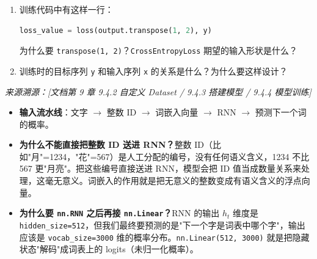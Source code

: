 \documentclass[a4paper,11pt]{ctexart}
\begin{document}
\begin{problembox}
\begin{enumerate}[(1)]
        \item 训练代码中有这样一行：
        \begin{lstlisting}[language=Python]
loss_value = loss(output.transpose(1, 2), y)
        \end{lstlisting}
        为什么要 \texttt{transpose(1, 2)}？\texttt{CrossEntropyLoss} 期望的输入形状是什么？

        \item 训练时的目标序列 \texttt{y} 和输入序列 \texttt{x} 的关系是什么？为什么要这样设计？
    \end{enumerate}

    \vspace{0.2cm}
    {\color{gray}\small\textit{来源溯源：[文档第 9 章 9.4.2 自定义 Dataset / 9.4.3 搭建模型 / 9.4.4 模型训练]}}
\end{problembox}

\begin{beginnerbox}
    \begin{itemize}
        \item \textbf{输入流水线}：文字 $\to$ 整数 ID $\to$ 词嵌入向量 $\to$ RNN $\to$ 预测下一个词的概率。
        \item \textbf{为什么不能直接把整数 ID 送进 RNN？}整数 ID（比如"月"=1234，"花"=567）是人工分配的编号，没有任何语义含义，1234 不比 567 更"月亮"。把这些编号直接送进 RNN，模型会把 ID 值当成数量关系来处理，这毫无意义。词嵌入的作用就是把无意义的整数变成有语义含义的浮点向量。
        \item \textbf{为什么要 \texttt{nn.RNN} 之后再接 \texttt{nn.Linear}？}RNN 的输出 $h_t$ 维度是 \texttt{hidden\_size=512}，但我们最终要预测的是"下一个字是词表中哪个字"，输出应该是 \texttt{vocab\_size=3000} 维的概率分布。\texttt{nn.Linear(512, 3000)} 就是把隐藏状态"解码"成词表上的 logits（未归一化概率）。
    \end{itemize}
\end{beginnerbox}
\end{document}
